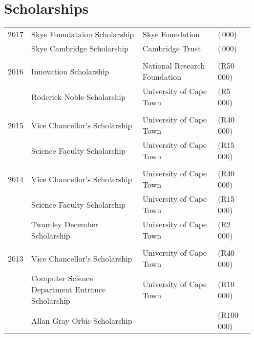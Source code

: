 
\section{Scholarships}

\begin{tabular}{R{1cm}|lll}
2017 & Skye Foundataion Scholarship & Skye Foundation&\footnotesize(\,000)\normalsize\\
     & Skye Cambridge Scholarship & Cambridge Trust &\footnotesize(\,000)\normalsize\\
&&\\
2016 & Innovation Scholarship & National Research Foundation&\footnotesize(R50\,000)\normalsize\\
     &Roderick Noble Scholarship & University of Cape Town & \footnotesize(R5\,000)\normalsize\\
&&\\
2015 & Vice Chancellor's Scholarship & University of Cape Town &\footnotesize(R40\,000)\normalsize\\
& Science Faculty Scholarship & University of Cape Town &\footnotesize(R15\,000)\normalsize\\
&&\\
2014 & Vice Chancellor's Scholarship & University of Cape Town &\footnotesize(R40\,000)\normalsize\\
& Science Faculty Scholarship & University of Cape Town &\footnotesize(R15\,000)\normalsize\\
& Twamley December Scholarship & University of Cape Town &\footnotesize(R2\,000)\normalsize\\
&&\\
2013 & Vice Chancellor's Scholarship & University of Cape Town &\footnotesize(R40\,000)\normalsize\\
& Computer Science Department Entrance Scholarship & University of Cape Town &\footnotesize(R10\,000)\normalsize\\
& Allan Gray Orbis Scholarship &&\footnotesize(R100\,000)\normalsize\\
\end{tabular}

